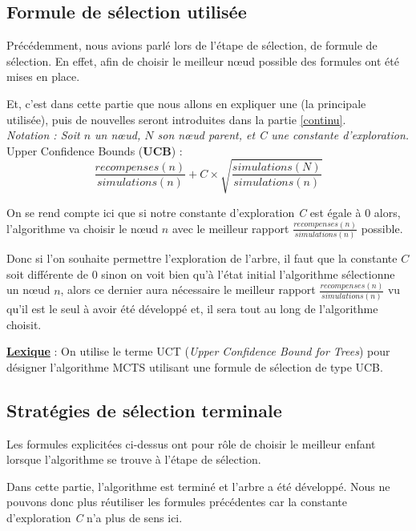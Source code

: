\documentclass[pdftex,french, english]{article}	%
\begin{document}
    
	\subsection{Formule de sélection utilisée} \label{selection}
	Précédemment, nous avions parlé lors de l'étape de sélection, de formule de sélection. 
	En effet, afin de choisir le meilleur nœud possible des formules ont été mises en place.


	Et, c'est dans cette partie que nous allons en expliquer une (la principale utilisée), puis de nouvelles seront introduites
	dans la partie \ref{continu}. \\

	\textit{Notation : Soit $n$ un nœud, $N$ son nœud parent, et C une constante d'exploration.} \\

	Upper Confidence Bounds (\textbf{UCB}) :
		\[ \frac{recompenses(n)}{simulations(n)} + C \times \sqrt{\frac{simulations(N)}{simulations(n)}} \] 

		On se rend compte ici que si notre constante d'exploration \textit{C} est égale à $0$ alors, l'algorithme va choisir le nœud $n$ avec le meilleur rapport $\frac{recompenses(n)}{simulations(n)}$ possible. 

		Donc si l'on souhaite permettre l'exploration de l'arbre, il faut que la constante $C$ soit différente de $0$ sinon on voit bien qu'à l'état initial l'algorithme sélectionne un nœud $n$, alors ce dernier aura nécessaire le meilleur rapport $\frac{recompenses(n)}{simulations(n)}$ vu qu'il est le seul à avoir été développé et,  il sera tout au long de l'algorithme choisit. 


		\underline{\textbf{Lexique}} : On utilise le terme UCT (\textit{Upper Confidence Bound for Trees}) pour désigner l'algorithme MCTS utilisant une formule de sélection de type UCB.





	\subsection{Stratégies de sélection terminale} \label{selectionFinale}
	Les formules explicitées ci-dessus ont pour rôle de choisir le meilleur enfant lorsque l'algorithme se trouve à l'étape de sélection. 

	Dans cette partie, l'algorithme est terminé et l'arbre a été développé. Nous ne pouvons donc plus réutiliser les formules précédentes car la constante d'exploration \textit{C} n'a plus de sens ici. 
\end{document}
